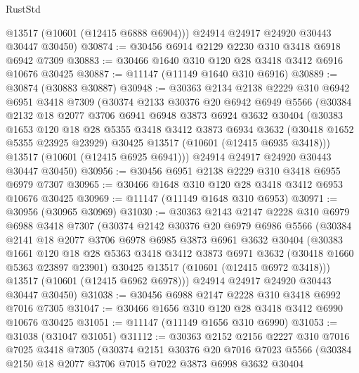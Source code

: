 \begin{lexlean}{RustStd}
\begin{coremodule}
        @13517
        (@10601 (@12415 @6888 @6904)))
      @24914
      @24917
      @24920
      @30443
      @30447
      @30450)
@30874 := @30456 @6914 @2129 @2230 @310 @3418 @6918 @6942 @7309
@30883 := @30466 @1640 @310 @120 @28 @3418 @3412 @6916 @10676 @30425
@30887 := @11147 (@11149 @1640 @310 @6916)
@30889 := @30874 (@30883 @30887)
@30948 := @30363
    @2134
    @2138
    @2229
    @310
    @6942
    @6951
    @3418
    @7309
    (@30374
      @2133
      @30376
      @20
      @6942
      @6949
      @5566
      (@30384
        @2132
        @18
        @2077
        @3706
        @6941
        @6948
        @3873
        @6924
        @3632
        @30404
        (@30383
          @1653
          @120
          @18
          @28
          @5355
          @3418
          @3412
          @3873
          @6934
          @3632
          (@30418 @1652 @5355 @23925 @23929)
          @30425
          @13517
          (@10601 (@12415 @6935 @3418)))
        @13517
        (@10601 (@12415 @6925 @6941)))
      @24914
      @24917
      @24920
      @30443
      @30447
      @30450)
@30956 := @30456 @6951 @2138 @2229 @310 @3418 @6955 @6979 @7307
@30965 := @30466 @1648 @310 @120 @28 @3418 @3412 @6953 @10676 @30425
@30969 := @11147 (@11149 @1648 @310 @6953)
@30971 := @30956 (@30965 @30969)
@31030 := @30363
    @2143
    @2147
    @2228
    @310
    @6979
    @6988
    @3418
    @7307
    (@30374
      @2142
      @30376
      @20
      @6979
      @6986
      @5566
      (@30384
        @2141
        @18
        @2077
        @3706
        @6978
        @6985
        @3873
        @6961
        @3632
        @30404
        (@30383
          @1661
          @120
          @18
          @28
          @5363
          @3418
          @3412
          @3873
          @6971
          @3632
          (@30418 @1660 @5363 @23897 @23901)
          @30425
          @13517
          (@10601 (@12415 @6972 @3418)))
        @13517
        (@10601 (@12415 @6962 @6978)))
      @24914
      @24917
      @24920
      @30443
      @30447
      @30450)
@31038 := @30456 @6988 @2147 @2228 @310 @3418 @6992 @7016 @7305
@31047 := @30466 @1656 @310 @120 @28 @3418 @3412 @6990 @10676 @30425
@31051 := @11147 (@11149 @1656 @310 @6990)
@31053 := @31038 (@31047 @31051)
@31112 := @30363
    @2152
    @2156
    @2227
    @310
    @7016
    @7025
    @3418
    @7305
    (@30374
      @2151
      @30376
      @20
      @7016
      @7023
      @5566
      (@30384
        @2150
        @18
        @2077
        @3706
        @7015
        @7022
        @3873
        @6998
        @3632
        @30404

\end{coremodule}
\end{lexlean}
